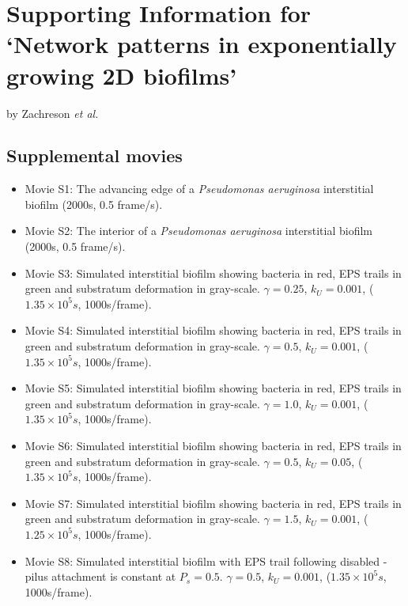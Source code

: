 \documentclass[aps,prl,numerical,reprint,superscriptaddress,showpacs]{revtex4-1}
\begin{document}
\newcommand{\beginsupplement}{%
        \setcounter{table}{0}
        \renewcommand{\thetable}{S\arabic{table}}%
        \setcounter{figure}{0}
        \renewcommand{\thefigure}{S\arabic{figure}}%
        \setcounter{page}{1}
        \renewcommand{\thepage}{S\arabic{page}} 
     }
     



\section*{Supporting Information for\\`Network patterns in exponentially growing 2D biofilms'}
\centerline {by Zachreson \it et al.}
\hspace{1cm}
\beginsupplement
\newcommand{\uvec}[1]{\boldsymbol{\hat{\textbf{#1}}}}
\subsection{Supplemental movies}

\begin{itemize}
\item Movie S1: The advancing edge of a {\it{Pseudomonas aeruginosa}} interstitial biofilm (2000s, 0.5 frame/s).
\item Movie S2: The interior of a {\it{Pseudomonas aeruginosa}} interstitial biofilm (2000s, 0.5 frame/s). 
\item Movie S3: Simulated interstitial biofilm showing bacteria in red, EPS trails in green and substratum deformation in gray-scale. $\gamma = 0.25$, $k_U = 0.001$, ($1.35 \times 10^5s$,  1000s/frame). 
\item Movie S4: Simulated interstitial biofilm showing bacteria in red, EPS trails in green and substratum deformation in gray-scale. $\gamma = 0.5$, $k_U = 0.001$, ($1.35 \times 10^5s$,  1000s/frame). 
\item Movie S5: Simulated interstitial biofilm showing bacteria in red, EPS trails in green and substratum deformation in gray-scale. $\gamma = 1.0$, $k_U = 0.001$, ($1.35 \times 10^5s$,  1000s/frame). 
\item Movie S6: Simulated interstitial biofilm showing bacteria in red, EPS trails in green and substratum deformation in gray-scale. $\gamma = 0.5$, $k_U = 0.05$, ($1.35 \times 10^5s$,  1000s/frame). 
\item Movie S7: Simulated interstitial biofilm showing bacteria in red, EPS trails in green and substratum deformation in gray-scale. $\gamma = 1.5$, $k_U = 0.001$, ($1.25 \times 10^5s$,  1000s/frame). 
\item Movie S8: Simulated interstitial biofilm with EPS trail following disabled - pilus attachment is constant at $P_s = 0.5$. $\gamma = 0.5$, $k_U = 0.001$, ($1.35 \times 10^5s$,  1000s/frame). 
\end{itemize}
\end{document}
